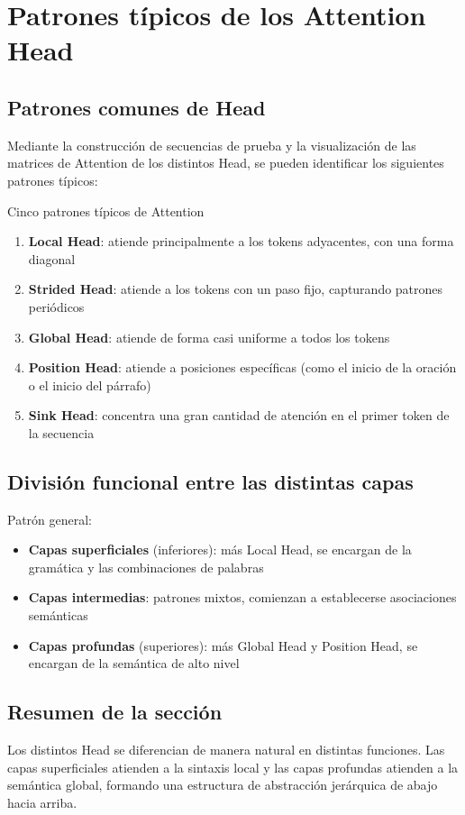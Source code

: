 \section{Patrones típicos de los Attention Head}

\subsection{Patrones comunes de Head}

Mediante la construcción de secuencias de prueba y la visualización de las matrices de Attention de los distintos Head, se pueden identificar los siguientes patrones típicos:

\begin{importantbox}{Cinco patrones típicos de Attention}
\begin{enumerate}
  \item \textbf{Local Head}: atiende principalmente a los tokens adyacentes, con una forma diagonal
  \item \textbf{Strided Head}: atiende a los tokens con un paso fijo, capturando patrones periódicos
  \item \textbf{Global Head}: atiende de forma casi uniforme a todos los tokens
  \item \textbf{Position Head}: atiende a posiciones específicas (como el inicio de la oración o el inicio del párrafo)
  \item \textbf{Sink Head}: concentra una gran cantidad de atención en el primer token de la secuencia
\end{enumerate}
\end{importantbox}

\subsection{División funcional entre las distintas capas}

Patrón general:
\begin{itemize}
  \item \textbf{Capas superficiales} (inferiores): más Local Head, se encargan de la gramática y las combinaciones de palabras
  \item \textbf{Capas intermedias}: patrones mixtos, comienzan a establecerse asociaciones semánticas
  \item \textbf{Capas profundas} (superiores): más Global Head y Position Head, se encargan de la semántica de alto nivel
\end{itemize}

\subsection{Resumen de la sección}

Los distintos Head se diferencian de manera natural en distintas funciones. Las capas superficiales atienden a la sintaxis local y las capas profundas atienden a la semántica global, formando una estructura de abstracción jerárquica de abajo hacia arriba.

